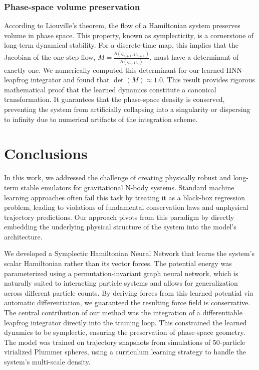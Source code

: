 \documentclass[]{article}
\begin{document}
\subsubsection{Phase-space volume preservation}

According to Liouville's theorem, the flow of a Hamiltonian system preserves volume in phase space. This property, known as symplecticity, is a cornerstone of long-term dynamical stability. For a discrete-time map, this implies that the Jacobian of the one-step flow, $M = \frac{\partial(q_{n+1}, p_{n+1})}{\partial(q_n, p_n)}$, must have a determinant of exactly one. We numerically computed this determinant for our learned HNN-leapfrog integrator and found that $\det(M) \approx 1.0$. This result provides rigorous mathematical proof that the learned dynamics constitute a canonical transformation. It guarantees that the phase-space density is conserved, preventing the system from artificially collapsing into a singularity or dispersing to infinity due to numerical artifacts of the integration scheme.

\section{Conclusions}
\label{sec:conclusions}
In this work, we addressed the challenge of creating physically robust and long-term stable emulators for gravitational N-body systems. Standard machine learning approaches often fail this task by treating it as a black-box regression problem, leading to violations of fundamental conservation laws and unphysical trajectory predictions. Our approach pivots from this paradigm by directly embedding the underlying physical structure of the system into the model's architecture.

We developed a Symplectic Hamiltonian Neural Network that learns the system's scalar Hamiltonian rather than its vector forces. The potential energy was parameterized using a permutation-invariant graph neural network, which is naturally suited to interacting particle systems and allows for generalization across different particle counts. By deriving forces from this learned potential via automatic differentiation, we guaranteed the resulting force field is conservative. The central contribution of our method was the integration of a differentiable leapfrog integrator directly into the training loop. This constrained the learned dynamics to be symplectic, ensuring the preservation of phase-space geometry. The model was trained on trajectory snapshots from simulations of 50-particle virialized Plummer spheres, using a curriculum learning strategy to handle the system's multi-scale density.
\end{document}
